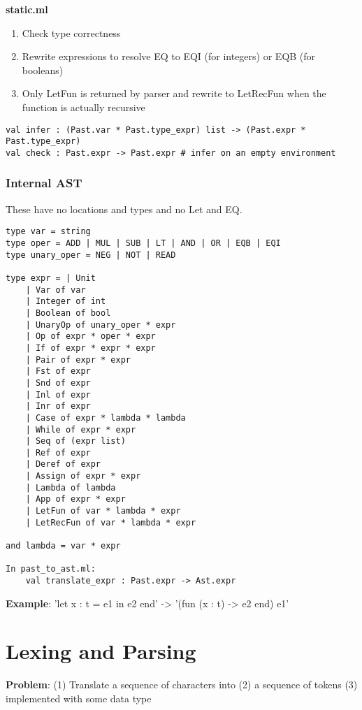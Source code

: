 \documentclass{article}
\begin{document}
\noindent
\textbf{static.ml}
\begin{enumerate}
	\item Check type correctness
	\item Rewrite expressions to resolve EQ to EQI (for integers) or EQB (for booleans)
	\item Only LetFun is returned by parser and rewrite to LetRecFun when the function is actually recursive
\end{enumerate}

\begin{lstlisting}
val infer : (Past.var * Past.type_expr) list -> (Past.expr * Past.type_expr)
val check : Past.expr -> Past.expr # infer on an empty environment
\end{lstlisting}

\subsubsection{Internal AST}
These have no locations and types and no Let and EQ.
\begin{lstlisting}
type var = string
type oper = ADD | MUL | SUB | LT | AND | OR | EQB | EQI 
type unary_oper = NEG | NOT | READ

type expr = | Unit
	| Var of var
	| Integer of int
	| Boolean of bool
	| UnaryOp of unary_oper * expr
	| Op of expr * oper * expr
	| If of expr * expr * expr
	| Pair of expr * expr
	| Fst of expr
	| Snd of expr
	| Inl of expr
	| Inr of expr
	| Case of expr * lambda * lambda
	| While of expr * expr
	| Seq of (expr list)
	| Ref of expr
	| Deref of expr
	| Assign of expr * expr
	| Lambda of lambda
	| App of expr * expr
	| LetFun of var * lambda * expr
	| LetRecFun of var * lambda * expr
	
and lambda = var * expr

In past_to_ast.ml:
	val translate_expr : Past.expr -> Ast.expr
\end{lstlisting}

\textbf{Example}: 'let x : t = e1 in e2 end' -> '(fun (x : t) -> e2 end) e1'

\section{Lexing and Parsing}
\textbf{Problem}: (1) Translate a sequence of characters into (2) a sequence of tokens (3) implemented with some data type
\end{document}
